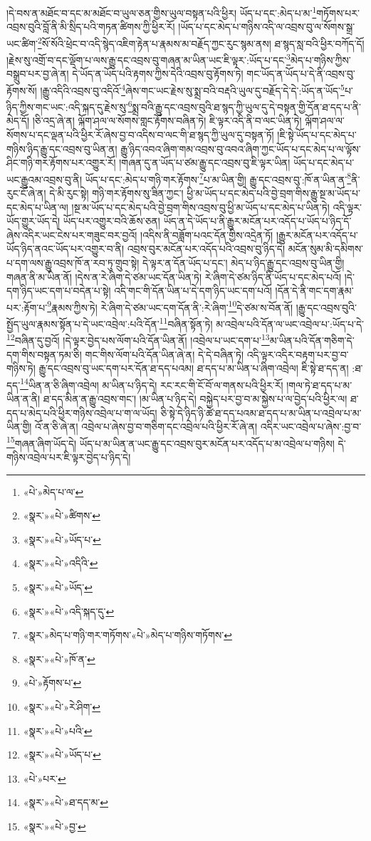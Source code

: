 །དེ་བས་ན་མཐོང་བ་དང་མ་མཐོང་བ་ཡུལ་ཅན་གྱིས་ཡུལ་བསྟན་པའི་ཕྱིར། ཡོད་པ་དང་:མེད་པ་མ་\footnote{«པེ་»མེད་པ་ལ་}གཏོགས་པར་འབྲས་བུའི་བློ་ནི་མི་སྲིད་པའི་གཏན་ཚིགས་ཀྱི་ཕྱིར་རོ། །ཡོད་པ་དང་མེད་པ་གཉིས་འདི་ལ་འབྲས་བུ་ལ་སོགས་སྒྲ་ཡང་ཚིག་\footnote{«སྣར་»«པེ་»ཚིགས་}སོ་སོའི་ཕྲེང་བ་འདི་སྙེད་འཇིག་རྟེན་པ་རྣམས་མ་བརྗོད་ཀྱང་རུང་སྙམ་ནས། ཐ་སྙད་སླ་བའི་ཕྱིར་བཀོད་དོ། །རྗེས་སུ་འགྲོ་བ་དང་ལྡོག་པ་ལས་རྒྱུ་དང་འབྲས་བུ་གཞན་མ་ཡིན་ཡང་ཇི་ལྟར་:ཡོད་པ་དང་\footnote{«སྣར་»«པེ་»ཡོད་པ་}མེད་པ་གཉིས་ཀྱིས་བསྒྲུབ་པར་བྱ་ཞེ་ན། དེ་ཡོད་ན་ཡོད་པའི་རྟགས་ཀྱིས་དེའི་འབྲས་བུ་རྟོགས་ཏེ། གང་ཡོད་ན་ཡོད་པ་དེ་ནི་འབྲས་བུ་རྟོགས་སོ། །རྒྱུ་འདིའི་འབྲས་བུ་འདིའོ་\footnote{«སྣར་»«པེ་»འདིའི་}ཞེས་གང་ཡང་རྗེས་སུ་སྨྲ་བའི་བརྡའི་ཡུལ་དུ་བརྗོད་དེ་དེ་:ཡོད་ན་ཡོད་\footnote{«སྣར་»«པེ་»ཡོད་}པ་ཉིད་ཀྱིས་གང་ཡང་:འདི་སྐད་དུ་རྗེས་སུ་\footnote{«སྣར་»«པེ་»འདི་སྐད་དུ་}སྨྲ་བའི་རྒྱུ་དང་འབྲས་བུའི་ཐ་སྙད་ཀྱི་ཡུལ་དུ་དེ་བསྟན་གྱི་དོན་ཐ་དད་པ་ནི་མེད་དོ། །ཅི་འདྲ་ཞེ་ན། ལྐོག་ཤལ་ལ་སོགས་གླང་རྟོགས་བཞིན་ཏེ། ཇི་ལྟར་འདི་ནི་བ་ལང་ཡིན་ཏེ། ལྐོག་ཤལ་ལ་སོགས་པ་དང་ལྡན་པའི་ཕྱིར་རོ་ཞེས་བྱ་བ་འདིས་བ་ལང་གི་ཐ་སྙད་ཀྱི་ཡུལ་དུ་བསྟན་ཏོ། །ཇི་སྟེ་ཡོད་པ་དང་མེད་པ་གཉིས་ཉིད་རྒྱུ་དང་འབྲས་བུ་ཡིན་ན། རྒྱུ་ཉིད་འབའ་ཞིག་གམ་འབྲས་བུ་འབའ་ཞིག་ཀྱང་ཡོད་པ་དང་མེད་པ་ལ་ལྟོས་ཤིང་གཉི་གར་རྟོགས་པར་འགྱུར་རོ། །གཞན་དུ་ན་ཡོད་པ་ཙམ་རྒྱུ་དང་འབྲས་བུ་ཇི་ལྟར་ཡིན། ཡོད་པ་དང་མེད་པ་ཡང་རྒྱུའམ་འབྲས་བུ་ནི། ཡོད་པ་དང་:མེད་པ་གཉི་གར་རྟོགས་\footnote{«སྣར་»མེད་པ་གཉི་གར་གཏོགས་«པེ་»མེད་པ་གཉིས་གཏོགས་}པ་མ་ཡིན་གྱི། རྒྱུ་དང་འབྲས་བུ་:ཁོ་ན་ཡིན་ན་\footnote{«སྣར་»«པེ་»ཁོ་ན་}ནི་རུང་ངོ་ཞེ་ན། དེ་མི་རུང་སྟེ། གཉི་གར་རྟོགས་སུ་ཟིན་ཀྱང་། ཕྱི་མ་ཡོད་པ་དང་མེད་པའི་བྱེ་བྲག་གིས་རྒྱུ་སྔ་མ་ཡོད་པ་དང་མེད་པ་ཡིན་ལ། །སྔ་མ་ཡོད་པ་དང་མེད་པའི་བྱེ་བྲག་གིས་འབྲས་བུ་ཕྱི་མ་ཡོད་པ་དང་མེད་པ་ཡིན་ཏེ། འདི་ལྟར་ཡོད་གྱུར་ཡོད་དེ། ཡོད་པར་འགྱུར་བའི་ཆོས་ཅན། ཡོད་ན་དེ་ཡོད་པ་ནི་རྒྱུར་མངོན་པར་འདོད་པ་ཡོད་པ་ཉིད་དོ་ཞེས་འདིར་ཡང་ངེས་པར་གཟུང་བར་བྱའོ། །འདིས་ནི་བཟློག་པའང་དོན་གྱིས་འདྲེན་ཏོ། །རྒྱུར་མངོན་པར་འདོད་པ་ཡོད་ཉིད་ནའང་ཡོད་པར་འགྱུར་བ་ནི། འབྲས་བུར་མངོན་པར་འདོད་པའི་འབྲས་བུ་ཉིད་དེ། མངོན་སུམ་མི་དམིགས་པ་དག་ལས་རྒྱུ་འབྲས་ཁོ་ན་རབ་ཏུ་གྲུབ་སྟེ། དེ་ལྟར་ན་དོན་ཡོད་པ་དང་། མེད་པ་ཉིད་རྒྱུ་དང་འབྲས་བུ་ཡིན་གྱི། གཞན་ནི་མ་ཡིན་ནོ། །དེས་ན་རེ་ཞིག་དེ་ཙམ་ཡང་དོན་ཡིན་ཏེ། རེ་ཞིག་དེ་ཙམ་ཉིད་ནི་ཡོད་པ་དང་མེད་པའོ། །དེ་དག་ཉིད་ཡང་དག་པ་བདེན་པ་སྟེ། འདི་གང་གི་དོན་ཡིན་པ་དེ་དག་ཉིད་ཡང་དག་པའོ། །དོན་དེ་ནི་གང་དག་རྣམ་པར་:རྟོག་པ་\footnote{«པེ་»རྟོགས་པ་}རྣམས་ཀྱིས་ཏེ། རེ་ཞིག་དེ་ཙམ་ཡང་དག་དོན་ནི་:རེ་ཞིག་\footnote{«སྣར་»«པེ་»རེ་ཤིག་}དེ་ཙམ་ས་བོན་ནོ། །རྒྱུ་དང་འབྲས་བུའི་སྤྱོད་ཡུལ་རྣམས་སྟོན་པ་དེ་ཡང་འབྲེལ་:པའི་དོན་\footnote{«སྣར་»«པེ་»པའི་}བཞིན་སྟོན་ཏེ། མ་འབྲེལ་པའི་དོན་ལ་ཡང་འབྲེལ་པ་:ཡོད་པ་དེ་\footnote{«སྣར་»«པེ་»ཡོད་པ་}བཞིན་དུ་བྱའོ། །དེ་ལྟར་བྱེད་པས་ལོག་པའི་དོན་ཡིན་ནོ། །འབྲེལ་པ་ཡང་དག་པ་\footnote{«པེ་»པར་}མ་ཡིན་པའི་དོན་གཅིག་དེ་དག་གིས་བསྟན་ཏམ་ཅི། གང་གིས་ལོག་པའི་དོན་ཡིན་ཞེ་ན། དེ་དེ་བཞིན་ཏེ། འདི་ལྟར་འདིར་བརྟག་པར་བྱ་བ་གཉིས་ཏེ། རྒྱུ་དང་འབྲས་བུ་ཡང་དག་པར་དོན་ཐ་དད་པའམ། ཐ་དད་པ་མ་ཡིན་པ་ཞིག་འབྲེལ། ཇི་སྟེ་ཐ་དད་ན། :ཐ་དད་\footnote{«སྣར་»«པེ་»ཐ་དད་མ་}ཡིན་ན་ཅི་ཞིག་འབྲེལ། མ་ཡིན་པ་ཉིད་དེ། རང་རང་གི་ངོ་བོ་ལ་གནས་པའི་ཕྱིར་རོ། །གལ་ཏེ་ཐ་དད་པ་མ་ཡིན་ན་ནི། ཐ་དད་མིན་ན་རྒྱུ་འབྲས་གང་། །མ་ཡིན་པ་ཉིད་དེ། བསྐྱེད་པར་བྱ་བ་མ་སྐྱེས་པ་ལ་བྱེད་པའི་ཕྱིར་ལ། ཐ་དད་པ་མེད་པའི་ཕྱིར་གཉིས་འབྲེལ་པ་ག་ལ་ཡོད། ཅི་སྟེ་དེ་ཉིད་ཉི་ཚེ་ཐ་དད་པའམ་ཐ་དད་པ་མ་ཡིན་པ་འབྲེལ་པ་མ་ཡིན་གྱི། འོ་ན་ཅི་ཞེ་ན། འབྲེལ་པ་ཞེས་བྱ་བ་གཅིག་དང་འབྲེལ་པའི་ཕྱིར་རོ་ཞེ་ན། འདིར་ཡང་འབྲེལ་པ་ཞེས་:བྱ་བ་\footnote{«སྣར་»«པེ་»བྱ་}གཞན་ཞིག་ཡོད་དེ། ཡོད་པ་མ་ཡིན་ན་ཡང་རྒྱུ་དང་འབྲས་བུར་མངོན་པར་འདོད་པ་མ་འབྲེལ་པ་གཉིས། དེ་གཉིས་འབྲེལ་པར་ཇི་ལྟར་བྱེད་པ་ཉིད་དེ། 